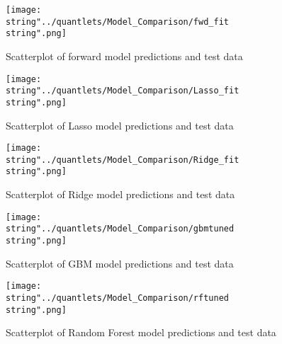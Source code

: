 \begin{figure}[H]
\centering
	\texttt{[image: \\string"../quantlets/Model\_Comparison/fwd\_fit\\string".png]}
  	\caption{Scatterplot of forward model predictions and test data}
  	\label{fig:fwd}
\end{figure}

\begin{figure}[H]
\centering
	\texttt{[image: \\string"../quantlets/Model\_Comparison/Lasso\_fit\\string".png]}
  	\caption{Scatterplot of Lasso model predictions and test data}
  	\label{fig:Lasso}
\end{figure}

\begin{figure}[H]
\centering
	\texttt{[image: \\string"../quantlets/Model\_Comparison/Ridge\_fit\\string".png]}
  	\caption{Scatterplot of Ridge model predictions and test data}
  	\label{fig:Ridge}
\end{figure}

\begin{figure}[H]
\centering
	\texttt{[image: \\string"../quantlets/Model\_Comparison/gbmtuned\\string".png]}
  	\caption{Scatterplot of GBM model predictions and test data}
  	\label{fig:gbm}
\end{figure}

\begin{figure}[H]
\centering
	\texttt{[image: \\string"../quantlets/Model\_Comparison/rftuned\\string".png]}
  	\caption{Scatterplot of Random Forest model predictions and test data}
  	\label{fig:rf}
\end{figure}



